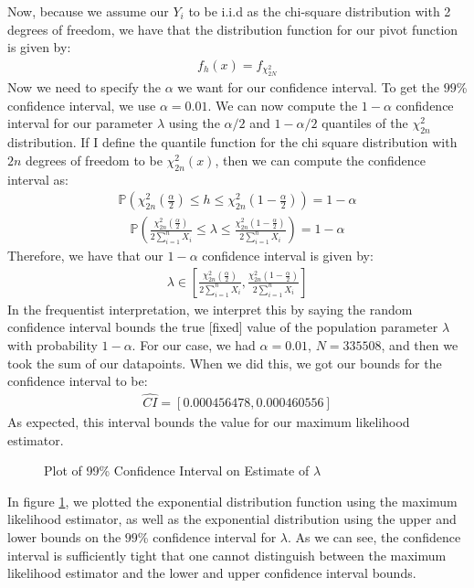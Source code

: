Now, because we assume our $Y_i$ to be i.i.d as the chi-square distribution with 2 degrees of freedom, we have that the distribution function for our pivot function is given by:
\begin{align}
        f_h(x)=f_{\chi^2_{2N}}
\end{align}
Now we need to specify the $\alpha$ we want for our confidence interval. To get the $99$\% confidence interval, we use $\alpha=0.01$. We can now compute the $1-\alpha$ confidence interval for our parameter $\lambda$ using the $\alpha/2$ and $1-\alpha/2$ quantiles of the $\chi_{2n}^2$ distribution. If I define the quantile function for the chi square distribution with $2n$ degrees of freedom to be $\chi_{2n}^2(x)$, then we can compute the confidence interval as:
\begin{align}
        \mathbb{P}\left( \chi_{2n}^2\left(\frac{\alpha}{2}\right)\leq h \leq \chi_{2n}^2\left( 1-\frac{\alpha}{2} \right) \right)=1-\alpha
\end{align}
\begin{align}
        \mathbb{P}\left( \frac{\chi_{2n}^2\left( \frac{\alpha}{2} \right)}{2\sum_{i=1}^nX_i} \leq \lambda \leq \frac{\chi_{2n}^2\left( 1-\frac{\alpha}{2} \right)}{2\sum_{i=1}^nX_i}\right)=1-\alpha
\end{align}
Therefore, we have that our $1-\alpha$ confidence interval is given by:
\begin{align}
        \lambda \in \left[ \frac{\chi_{2n}^2\left( \frac{\alpha}{2} \right)}{2\sum_{i=1}^nX_i}, \frac{\chi_{2n}^2\left( 1-\frac{\alpha}{2} \right)}{2\sum_{i=1}^nX_i}\right]
\end{align}
In the frequentist interpretation, we interpret this by saying the random confidence interval bounds the true [fixed] value of the population parameter $\lambda$ with probability $1-\alpha$. For our case, we had $\alpha=0.01$, $N=335508$, and then we took the sum of our datapoints. When we did this, we got our bounds for the confidence interval to be:
\begin{align}
        \hat{CI} = \left[ 0.000456478, 0.000460556 \right]
\end{align}
As expected, this interval bounds the value for our maximum likelihood estimator.
\begin{figure}[H]
    \centering
    \caption{Plot of 99\% Confidence Interval on Estimate of $\lambda$}
    \label{confidence_intervals}
\end{figure} 
In figure \ref{confidence_intervals}, we plotted the exponential distribution function using the maximum likelihood estimator, as well as the exponential distribution using the upper and lower bounds on the $99$\% confidence interval for $\lambda$. As we can see, the confidence interval is sufficiently tight that one cannot distinguish between the maximum likelihood estimator and the lower and upper confidence interval bounds. 
